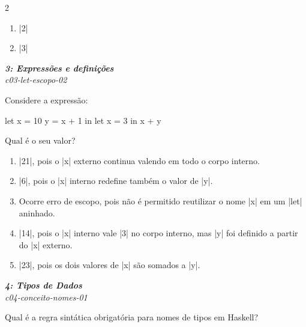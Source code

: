 \documentclass[a4paper,10pt,brazil]{article}
\begin{document}
\begin{multicols}{2}
\begin{enumerate}
  \item \haskellinline|2|

  \item \haskellinline|3|


\end{enumerate}

\begin{flushright}
  \footnotesize
  \textit{\textbf{3: Expressões e definições}}\\
  \textit{c03-let-escopo-02}\\

\end{flushright}
Considere a expressão:

\begin{haskellcode}
let x = 10
    y = x + 1
in let x = 3
   in x + y
\end{haskellcode}

Qual é o seu valor?

\begin{enumerate}
  \item \haskellinline|21|, pois o \haskellinline|x| externo continua valendo em todo o corpo interno.

  \item \haskellinline|6|, pois o \haskellinline|x| interno redefine também o valor de \haskellinline|y|.

  \item Ocorre erro de escopo, pois não é permitido reutilizar o nome \haskellinline|x| em um \haskellinline|let| aninhado.

  \item \haskellinline|14|, pois o \haskellinline|x| interno vale \haskellinline|3| no corpo interno, mas \haskellinline|y| foi definido a partir do \haskellinline|x| externo.

  \item \haskellinline|23|, pois os dois valores de \haskellinline|x| são somados a \haskellinline|y|.


\end{enumerate}

\begin{flushright}
  \footnotesize
  \textit{\textbf{4: Tipos de Dados}}\\
  \textit{c04-conceito-nomes-01}\\

\end{flushright}
Qual é a regra sintática obrigatória para nomes de tipos em Haskell?


\end{multicols}
\end{document}
